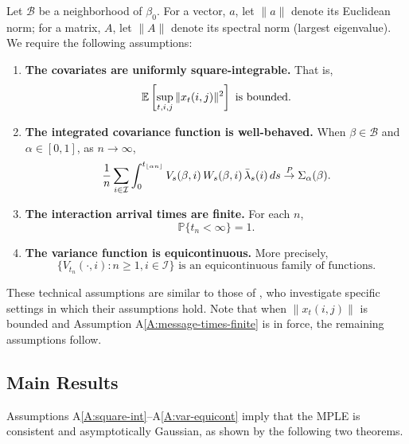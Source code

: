 \documentclass[final]{statsoc}
\begin{document}
Let $\mathcal{B}$ be a neighborhood of $\beta_0$.  For a vector, $a$, let
$\| a \|$ denote its Euclidean norm; for a matrix, $A$, let $\| A \|$ denote
its spectral norm (largest eigenvalue).  We require the following assumptions:
\begin{enumerate}[{A}1.]
    \item \label{A:square-int}
    \textbf{The covariates are uniformly square-integrable.}  That is,
    \[
        \mathbb{E}\left[
            \sup_{t, i, j} \| x_{t}(i,j) \|^2
        \right]
        \,\,\text{is bounded.}
    \]

    \item \label{A:integrated-cov-limit}
    \textbf{The integrated covariance function is well-behaved.}
    When $\beta \in \mathcal{B}$ and $\alpha \in [0,1]$, as $ n \to \infty$,
    \[
        \frac{1}{n}
        \sum_{i \in \mathcal{I}}
        \int_0^{t_{\lfloor \alpha n \rfloor}}
            V_s(\beta,i)
            \, W_s(\beta,i)
            \, \bar \lambda_s(i)
            \, ds
        \overset{\mathit{P}}{\to}
        \Sigma_\alpha(\beta).
    \]

    \item \label{A:message-times-finite}
    \textbf{The interaction arrival times are finite.}  For each $n$,
    \[
        \mathbb{P}\{t_n < \infty\} = 1.
    \]

    \item \label{A:var-equicont}
    \textbf{The variance function is equicontinuous.}
    More precisely,
    \[
        \Big\{
            V_{t_n}(\cdot, i)
            :
            n \geq 1, i \in \mathcal{I}
        \Big\}
        \,\,\text{is an equicontinuous family of functions.}
    \]
\end{enumerate}

These technical assumptions are similar to those of
\citet{andersen1982cox}, who investigate specific settings in which their
assumptions hold.  Note that when $\| x_t(i,j) \|$ is bounded and Assumption
A\ref{A:message-times-finite} is in force, the remaining assumptions follow.

\subsection{Main Results}
Assumptions A\ref{A:square-int}--A\ref{A:var-equicont} imply that the MPLE is consistent and asymptotically
Gaussian, as shown by the following two theorems.
\end{document}
